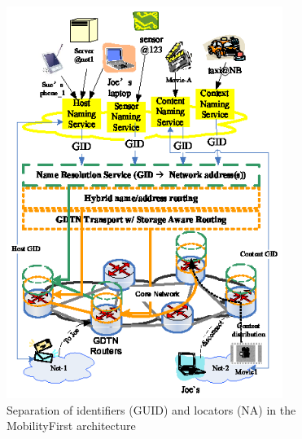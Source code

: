     \begin{center}
        \begin{figure}[t]
            \centering
            \includegraphics[width=0.8\textwidth]{figures/mobilityFirst.eps}
            \caption{Separation of identifiers (GUID) and locators (NA) in the MobilityFirst architecture}
            \label{fig:mobilityFirst}
        \end{figure}
    \end{center}

